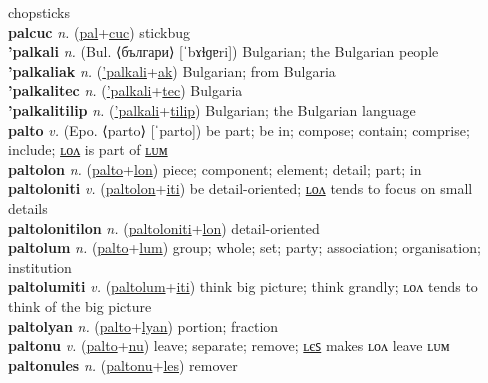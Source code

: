 chopsticks \label{palnyamaluat} \\
\textbf{palcuc} \textit{n.} (\hyperref[pal]{pal}+\hyperref[cuc]{cuc})
stickbug \label{palcuc} \\
\textbf{'palkali} \textit{n.} (Bul. ⟨българи⟩ [ˈbɤɫɡɐri])
Bulgarian; the Bulgarian people \label{'palkali} \\
\textbf{'palkaliak} \textit{n.} (\hyperref['palkali]{'palkali}+\hyperref[ak]{ak})
Bulgarian; from Bulgaria \label{'palkaliak} \\
\textbf{'palkalitec} \textit{n.} (\hyperref['palkali]{'palkali}+\hyperref[tec]{tec})
Bulgaria \label{'palkalitec} \\
\textbf{'palkalitilip} \textit{n.} (\hyperref['palkali]{'palkali}+\hyperref[tilip]{tilip})
Bulgarian; the Bulgarian language \label{'palkalitilip} \\
\textbf{palto} \textit{v.} (Epo. ⟨parto⟩ [ˈparto])
be part; be in; compose; contain; comprise; include; \hyperref[paltolon]{ʟᴏᴧ} is part of \hyperref[paltolum]{ʟᴜᴍ} \label{palto} \\
\textbf{paltolon} \textit{n.} (\hyperref[palto]{palto}+\hyperref[lon]{lon})
piece; component; element; detail; part; in \label{paltolon} \\
\textbf{paltoloniti} \textit{v.} (\hyperref[paltolon]{paltolon}+\hyperref[iti]{iti})
be detail-oriented; \hyperref[paltolonitilon]{ʟᴏᴧ} tends to focus on small details \label{paltoloniti} \\
\textbf{paltolonitilon} \textit{n.} (\hyperref[paltoloniti]{paltoloniti}+\hyperref[lon]{lon})
detail-oriented \label{paltolonitilon} \\
\textbf{paltolum} \textit{n.} (\hyperref[palto]{palto}+\hyperref[lum]{lum})
group; whole; set; party; association; organisation; institution \label{paltolum} \\
\textbf{paltolumiti} \textit{v.} (\hyperref[paltolum]{paltolum}+\hyperref[iti]{iti})
think big picture; think grandly; ʟᴏᴧ tends to think of the big picture \label{paltolumiti} \\
\textbf{paltolyan} \textit{n.} (\hyperref[palto]{palto}+\hyperref[lyan]{lyan})
portion; fraction \label{paltolyan} \\
\textbf{paltonu} \textit{v.} (\hyperref[palto]{palto}+\hyperref[nu]{nu})
leave; separate; remove; \hyperref[paltonules]{ʟєꜱ} makes ʟᴏᴧ leave ʟᴜᴍ \label{paltonu} \\
\textbf{paltonules} \textit{n.} (\hyperref[paltonu]{paltonu}+\hyperref[les]{les})
remover \label{paltonules} \\
